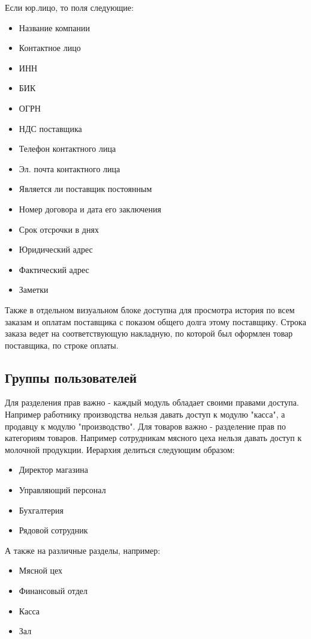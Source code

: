 \documentclass[DIV=calc, paper=a4, fontsize=11pt]{scrartcl} %
\begin{document}
Если юр.лицо, то поля следующие:

\begin{itemize}
	\item Название компании
	\item Контактное лицо
	\item ИНН
	\item БИК
	\item ОГРН
	\item НДС поставщика
	\item Телефон контактного лица
	\item Эл. почта контактного лица
	\item Является ли поставщик постоянным
	\item Номер договора и дата его заключения
	\item Срок отсрочки в днях
	\item Юридический адрес
	\item Фактический адрес
	\item Заметки
\end{itemize}

Также в отдельном визуальном блоке доступна для просмотра история по всем заказам и оплатам поставщика с показом общего долга этому поставщику. Строка заказа ведет на соответствующую накладную, по которой был оформлен товар поставщика, по строке оплаты.


\subsection{Группы пользователей}

Для разделения прав важно - каждый модуль обладает своими правами доступа. Например работнику производства нельзя давать доступ к модулю "касса", а продавцу к модулю "производство".
Для товаров важно - разделение прав по категориям товаров. Например сотрудникам мясного цеха нельзя давать доступ к молочной продукции.
Иерархия делиться следующим образом:

\begin{itemize}
	\item Директор магазина
	\item Управляющий персонал
	\item Бухгалтерия
	\item Рядовой сотрудник
\end{itemize}

А также на различные разделы, например:

\begin{itemize}
	\item Мясной цех
	\item Финансовый отдел
	\item Касса
	\item Зал
\end{itemize}
\end{document}
